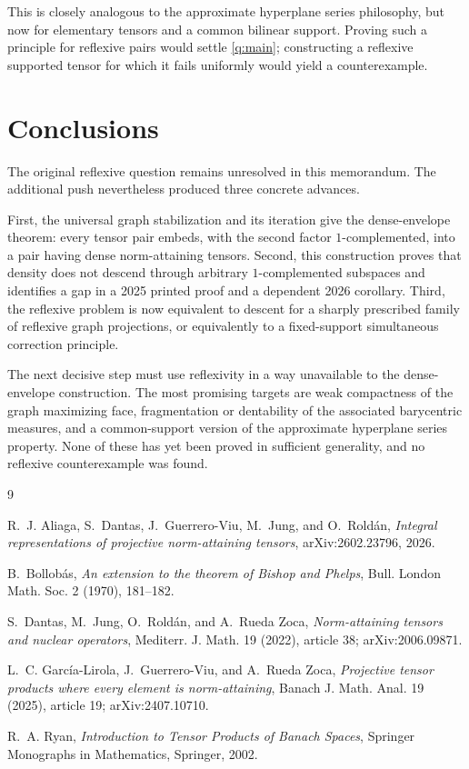 \documentclass[11pt]{article}
\theoremstyle{definition}
\theoremstyle{remark}
\begin{document}
This is closely analogous to the approximate hyperplane series philosophy, but now for elementary tensors and a common bilinear support.  Proving such a principle for reflexive pairs would settle \cref{q:main}; constructing a reflexive supported tensor for which it fails uniformly would yield a counterexample.

\section{Conclusions}

The original reflexive question remains unresolved in this memorandum.  The additional push nevertheless produced three concrete advances.

First, the universal graph stabilization and its iteration give the dense-envelope theorem: every tensor pair embeds, with the second factor $1$-complemented, into a pair having dense norm-attaining tensors.  Second, this construction proves that density does not descend through arbitrary $1$-complemented subspaces and identifies a gap in a 2025 printed proof and a dependent 2026 corollary.  Third, the reflexive problem is now equivalent to descent for a sharply prescribed family of reflexive graph projections, or equivalently to a fixed-support simultaneous correction principle.

The next decisive step must use reflexivity in a way unavailable to the dense-envelope construction.  The most promising targets are weak compactness of the graph maximizing face, fragmentation or dentability of the associated barycentric measures, and a common-support version of the approximate hyperplane series property.  None of these has yet been proved in sufficient generality, and no reflexive counterexample was found.

\begin{thebibliography}{9}

R.~J. Aliaga, S.~Dantas, J.~Guerrero-Viu, M.~Jung, and O.~Rold\'an,
\emph{Integral representations of projective norm-attaining tensors},
arXiv:2602.23796, 2026.

B.~Bollob\'as,
\emph{An extension to the theorem of Bishop and Phelps},
Bull. London Math. Soc. 2 (1970), 181--182.

S.~Dantas, M.~Jung, O.~Rold\'an, and A.~Rueda Zoca,
\emph{Norm-attaining tensors and nuclear operators},
Mediterr. J. Math. 19 (2022), article 38; arXiv:2006.09871.

L.~C. Garc\'ia-Lirola, J.~Guerrero-Viu, and A.~Rueda Zoca,
\emph{Projective tensor products where every element is norm-attaining},
Banach J. Math. Anal. 19 (2025), article 19; arXiv:2407.10710.

R.~A. Ryan,
\emph{Introduction to Tensor Products of Banach Spaces},
Springer Monographs in Mathematics, Springer, 2002.

\end{thebibliography}
\end{document}
